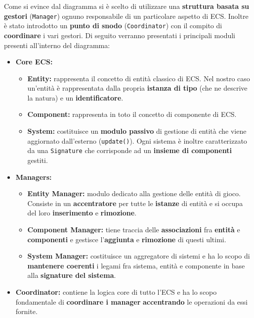 Come si evince dal diagramma si è scelto di utilizzare una \textbf{struttura basata su gestori} (\texttt{Manager}) ognuno responsabile di un particolare aspetto di ECS. Inoltre è stato introdotto un \textbf{punto di snodo} (\texttt{Coordinator}) con il compito di \textbf{coordinare} i vari gestori.
Di seguito verranno presentati i principali moduli presenti all'interno del diagramma:
\begin{itemize}
	\item{\textbf{Core ECS:}}
	\begin{itemize}
		\item{\textbf{Entity:}} rappresenta il concetto di entità classico di ECS. Nel nostro caso un'entità è rappresentata dalla propria \textbf{istanza di tipo} (che ne descrive la natura) e un \textbf{identificatore}.
		\item{\textbf{Component:}} rappresenta in toto il concetto di componente di ECS.
		\item{\textbf{System:}} costituisce un \textbf{modulo passivo} di gestione di entità che viene aggiornato 
		dall'esterno (\texttt{update()}). Ogni sistema è inoltre caratterizzato da una \texttt{Signature} che corrisponde ad un \textbf{insieme di componenti} gestiti.
	\end{itemize}
	\item{\textbf{Managers:}}
	\begin{itemize}
		\item{\textbf{Entity Manager:}} modulo dedicato alla gestione delle entità di gioco. Consiste in un \textbf{accentratore} per tutte le \textbf{istanze} di entità e si occupa del loro \textbf{inserimento} e \textbf{rimozione}. 
		\item{\textbf{Component Manager:}} tiene traccia delle \textbf{associazioni} fra \textbf{entità} e \textbf{componenti} e gestisce l'\textbf{aggiunta} e \textbf{rimozione} di questi ultimi.
		\item{\textbf{System Manager:}} costituisce un aggregatore di sistemi e ha lo scopo di \textbf{mantenere coerenti} i legami fra sistema, entità e componente in base alla \textbf{signature del sistema}. 
	\end{itemize}
	\item{\textbf{Coordinator:}} contiene la logica core di tutto l'ECS e ha lo scopo fondamentale di \textbf{coordinare i manager} \textbf{accentrando} le operazioni da essi fornite.
\end{itemize}



